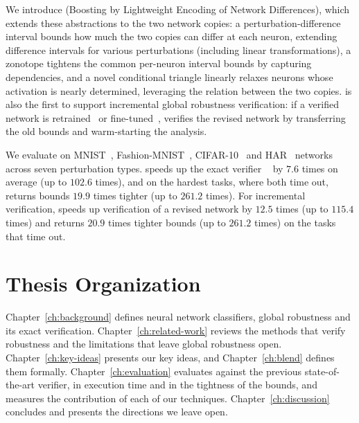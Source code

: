 We introduce \tool (Boosting by Lightweight Encoding of Network
Differences), which extends these abstractions to the two network
copies: a perturbation-difference interval bounds how much the two
copies can differ at each neuron, extending difference intervals for
various perturbations (including linear transformations), a zonotope
tightens the common per-neuron interval bounds by capturing
dependencies, and a novel conditional triangle linearly relaxes
neurons whose activation is nearly determined, leveraging the relation
between the two copies. \tool is also the first to support incremental
global robustness verification: if a verified network is
retrained~\cite{parisi2019} or fine-tuned~\cite{yosinski2014}, \tool
verifies the revised network by transferring the old bounds and
warm-starting the analysis.

We evaluate \tool on MNIST~\cite{lecun1998}, Fashion-MNIST~\cite{xiao2017},
CIFAR-10~\cite{krizhevsky2009} and HAR~\cite{anguita2013har} networks
across seven perturbation types. \tool speeds up the exact verifier
\baseline~\cite{kabaha2024vhagar} by $7.6$ times on
average (up to $102.6$ times), and on the hardest tasks,
where both time out, returns bounds $19.9$ times tighter
(up to $261.2$ times). For incremental verification, \tool
speeds up verification of a revised network by $12.5$
times (up to $115.4$ times) and returns
$20.9$ times tighter bounds (up to $261.2$
times) on the tasks that time out.


\section*{Thesis Organization}

Chapter~\ref{ch:background} defines neural network classifiers,
global robustness and its exact verification.
Chapter~\ref{ch:related-work} reviews the methods that verify
robustness and the limitations that leave global robustness open.
Chapter~\ref{ch:key-ideas} presents our key ideas, 
and Chapter~\ref{ch:blend} defines
them formally.
Chapter~\ref{ch:evaluation} evaluates \tool against the previous 
state-of-the-art verifier, in execution time and in the tightness of the
bounds, and measures the contribution of each of our techniques.
Chapter~\ref{ch:discussion} concludes and presents the directions we
leave open.
